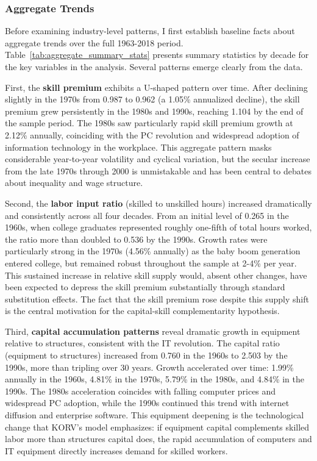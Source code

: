 \documentclass[12pt]{article}
\begin{document}
\subsubsection{Aggregate Trends}

Before examining industry-level patterns, I first establish baseline facts about aggregate trends over the full 1963-2018 period. Table~\ref{tab:aggregate_summary_stats} presents summary statistics by decade for the key variables in the analysis. Several patterns emerge clearly from the data.

First, the \textbf{skill premium} exhibits a U-shaped pattern over time. After declining slightly in the 1970s from 0.987 to 0.962 (a 1.05\% annualized decline), the skill premium grew persistently in the 1980s and 1990s, reaching 1.104 by the end of the sample period. The 1980s saw particularly rapid skill premium growth at 2.12\% annually, coinciding with the PC revolution and widespread adoption of information technology in the workplace. This aggregate pattern masks considerable year-to-year volatility and cyclical variation, but the secular increase from the late 1970s through 2000 is unmistakable and has been central to debates about inequality and wage structure.

Second, the \textbf{labor input ratio} (skilled to unskilled hours) increased dramatically and consistently across all four decades. From an initial level of 0.265 in the 1960s, when college graduates represented roughly one-fifth of total hours worked, the ratio more than doubled to 0.536 by the 1990s. Growth rates were particularly strong in the 1970s (4.56\% annually) as the baby boom generation entered college, but remained robust throughout the sample at 2-4\% per year. This sustained increase in relative skill supply would, absent other changes, have been expected to depress the skill premium substantially through standard substitution effects. The fact that the skill premium rose despite this supply shift is the central motivation for the capital-skill complementarity hypothesis.

Third, \textbf{capital accumulation patterns} reveal dramatic growth in equipment relative to structures, consistent with the IT revolution. The capital ratio (equipment to structures) increased from 0.760 in the 1960s to 2.503 by the 1990s, more than tripling over 30 years. Growth accelerated over time: 1.99\% annually in the 1960s, 4.81\% in the 1970s, 5.79\% in the 1980s, and 4.84\% in the 1990s. The 1980s acceleration coincides with falling computer prices and widespread PC adoption, while the 1990s continued this trend with internet diffusion and enterprise software. This equipment deepening is the technological change that KORV's model emphasizes: if equipment capital complements skilled labor more than structures capital does, the rapid accumulation of computers and IT equipment directly increases demand for skilled workers.
\end{document}
